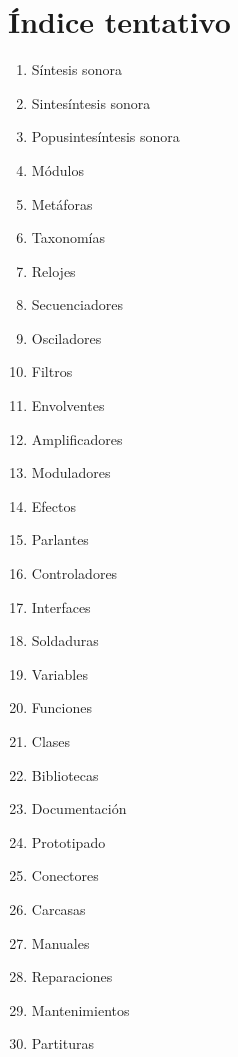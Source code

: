 \documentclass[../candidatura.tex]{subfiles}
\begin{document}
\section{Índice tentativo}


\begin{enumerate}
    \item Síntesis sonora
    \item Sintesíntesis sonora
    \item Popusintesíntesis sonora
    \item Módulos
    \item Metáforas
    \item Taxonomías
    \item Relojes
    \item Secuenciadores
    \item Osciladores
    \item Filtros
    \item Envolventes
    \item Amplificadores
    \item Moduladores
    \item Efectos
    \item Parlantes
    \item Controladores
    \item Interfaces
    \item Soldaduras
    \item Variables
    \item Funciones
    \item Clases
    \item Bibliotecas
    \item Documentación
    \item Prototipado
    \item Conectores
    \item Carcasas
    \item Manuales
    \item Reparaciones
    \item Mantenimientos
    \item Partituras
\end{enumerate}
\end{document}
